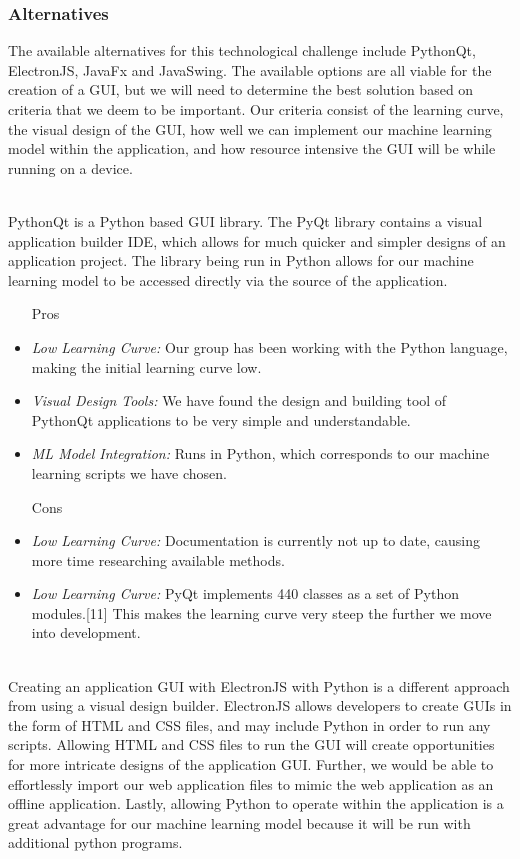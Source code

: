 \documentclass[12pt,journal,compsoc]{IEEEtran}
\newenvironment{subs}
  {\adjustwidth{1em}{0pt}}
  {\endadjustwidth}
\begin{document}
\begin{subs}
\begin{subs}
\subsubsection{Alternatives}
The available alternatives for this technological challenge include PythonQt, ElectronJS, JavaFx and JavaSwing. The available options are all viable for the creation of a GUI, but we will need to determine the best solution based on criteria that we deem to be important. Our criteria consist of the learning curve, the visual design of the GUI, how well we can implement our machine learning model within the application, and how resource intensive the GUI will be while running on a device.

\begin{subs}
\\
PythonQt is a Python based GUI library. The PyQt library contains a visual application builder IDE, which allows for much quicker and simpler designs of an application project. The library being run in Python allows for our machine learning model to be accessed directly via the source of the application.

\begin{subs}
\begin{itemize}
    \item [{Pros}]
    \item \emph{Low Learning Curve:} Our group has been working with the Python language, making the initial learning curve low.  
    \item \emph{Visual Design Tools:} We have found the design and building tool of PythonQt applications to be very simple and understandable.
    \item \emph{ML Model Integration:} Runs in Python, which corresponds to our machine learning scripts we have chosen.
    \item [{Cons}]
    \item \emph{Low Learning Curve:} Documentation is currently not up to date, causing more time researching available methods.
    \item \emph{Low Learning Curve:} PyQt implements 440 classes as a set of Python modules.[11] This makes the learning curve very steep the further we move into development.
\end{itemize}
\end{subs}

\\
Creating an application GUI with ElectronJS with Python is a different approach from using a visual design builder. ElectronJS allows developers to create GUIs in the form of HTML and CSS files, and may include Python in order to run any scripts. Allowing HTML and CSS files to run the GUI will create opportunities for more intricate designs of the application GUI. Further, we would be able to effortlessly import our web application files to mimic the web application as an offline application. Lastly, allowing Python to operate within the application is a great advantage for our machine learning model because it will be run with additional python programs. 


\end{subs}
\end{subs}
\end{subs}
\end{document}
